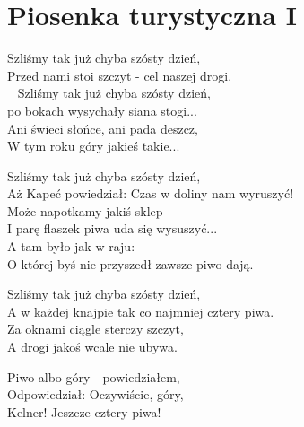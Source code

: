 \section{Piosenka turystyczna I}
\begin{text}
Szliśmy tak już chyba szósty dzień,\\
Przed nami stoi szczyt - cel naszej drogi.\\ 
Szliśmy tak już chyba szósty dzień,\\
po bokach wysychały siana stogi...\\
Ani świeci słońce, ani pada deszcz,\\
W tym roku góry jakieś takie... 

Szliśmy tak już chyba szósty dzień,\\
Aż Kapeć powiedział: Czas w doliny nam wyruszyć!\\
Może napotkamy jakiś sklep\\
I parę flaszek piwa uda się wysuszyć...\\

A tam było jak w raju:\\
O której byś nie przyszedł zawsze piwo dają.

Szliśmy tak już chyba szósty dzień,\\
A w każdej knajpie tak co najmniej cztery piwa.\\
Za oknami ciągle sterczy szczyt,\\
A drogi jakoś wcale nie ubywa.

Piwo albo góry - powiedziałem,\\
Odpowiedział: Oczywiście, góry,\\
Kelner! Jeszcze cztery piwa!
\end{text}